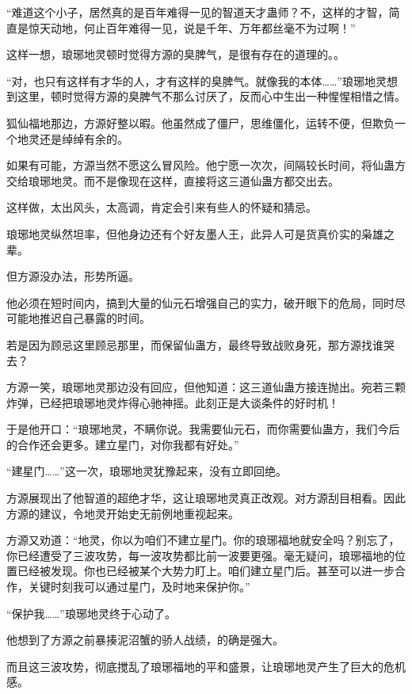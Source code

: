 
\begin{this_body}

“难道这个小子，居然真的是百年难得一见的智道天才蛊师？不，这样的才智，简直是惊天动地，何止百年难得一见，说是千年、万年都丝毫不为过啊！”

这样一想，琅琊地灵顿时觉得方源的臭脾气，是很有存在的道理的。。

“对，也只有这样有才华的人，才有这样的臭脾气。就像我的本体……”琅琊地灵想到这里，顿时觉得方源的臭脾气不那么讨厌了，反而心中生出一种惺惺相惜之情。

狐仙福地那边，方源好整以暇。他虽然成了僵尸，思维僵化，运转不便，但欺负一个地灵还是绰绰有余的。

如果有可能，方源当然不愿这么冒风险。他宁愿一次次，间隔较长时间，将仙蛊方交给琅琊地灵。而不是像现在这样，直接将这三道仙蛊方都交出去。

这样做，太出风头，太高调，肯定会引来有些人的怀疑和猜忌。

琅琊地灵纵然坦率，但他身边还有个好友墨人王，此异人可是货真价实的枭雄之辈。

但方源没办法，形势所逼。

他必须在短时间内，搞到大量的仙元石增强自己的实力，破开眼下的危局，同时尽可能地推迟自己暴露的时间。

若是因为顾忌这里顾忌那里，而保留仙蛊方，最终导致战败身死，那方源找谁哭去？

方源一笑，琅琊地灵那边没有回应，但他知道：这三道仙蛊方接连抛出。宛若三颗炸弹，已经把琅琊地灵炸得心驰神摇。此刻正是大谈条件的好时机！

于是他开口：“琅琊地灵，不瞒你说。我需要仙元石，而你需要仙蛊方，我们今后的合作还会更多。建立星门，对你我都有好处。”

“建星门……”这一次，琅琊地灵犹豫起来，没有立即回绝。

方源展现出了他智道的超绝才华，这让琅琊地灵真正改观。对方源刮目相看。因此方源的建议，令地灵开始史无前例地重视起来。

方源又劝道：“地灵，你以为咱们不建立星门。你的琅琊福地就安全吗？别忘了，你已经遭受了三波攻势，每一波攻势都比前一波要更强。毫无疑问，琅琊福地的位置已经被发现。你也已经被某个大势力盯上。咱们建立星门后。甚至可以进一步合作，关键时刻我可以通过星门，及时地来保护你。”

“保护我……”琅琊地灵终于心动了。

他想到了方源之前暴揍泥沼蟹的骄人战绩，的确是强大。

而且这三波攻势，彻底搅乱了琅琊福地的平和盛景，让琅琊地灵产生了巨大的危机感。


\end{this_body}

